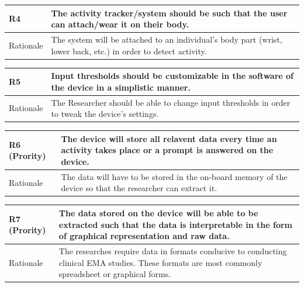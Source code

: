 \documentclass[12pt]{article}
\begin{document}
\hspace{0.5em}
\begin{center}
\begin{tabular}{|l|p{14cm}|}
 \hline
 R4 \label{R4} &The activity tracker/system should be such that the user can attach/wear it on their body.\\ [0.5ex]
 \hline
 Rationale &  The system will be attached to an individual's body part (wrist, lower back, etc.) in order to detect activity.\\ 
 \hline
\end{tabular}
\end{center}
\hspace{0.5em}
\begin{center}
\begin{tabular}{|l|p{14cm}|}
 \hline
 R5 \label{R5} &Input thresholds should be customizable in the software of the device in a simplistic manner.\\ [0.5ex]
 \hline
 Rationale & The Researcher should be able to change input thresholds in order to tweak the device's settings.\\ 
 \hline
\end{tabular}
\end{center}
\hspace{0.5em}
\begin{center}
\begin{tabular}{|l|p{14cm}|}
 \hline
 R6 \label{R6} (Prority) &The device will store all relavent data every time an activity takes place or a prompt is answered on the device.\\ [0.5ex]
 \hline
 Rationale & The data will have to be stored in the on-board memory of the device so that the researcher can extract it.\\ 
 \hline
\end{tabular}
\end{center}
\hspace{0.5em}
\begin{center}
\begin{tabular}{|l|p{14cm}|}
 \hline
 R7 \label{R7} (Prority) &The data stored on the device will be able to be extracted such that the data is interpretable in the form of graphical representation and raw data.\\[0.5ex]
 \hline
 Rationale & The researches require data in formats conducive to conducting clinical EMA studies. These formats are most commonly spreadsheet or graphical forms.\\ 
 \hline
\end{tabular}
\end{center}
\end{document}
